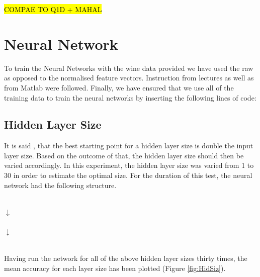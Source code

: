 \documentclass[10pt,twocolumn,letterpaper]{article}
\begin{document}
\hl{COMPAE TO Q1D + MAHAL}

\section{Neural Network}

To train the Neural Networks with the wine data provided we have used the raw as opposed to the normalised feature vectors. Instruction from lectures as well as from Matlab \cite{MatlabWine} were followed.  Finally, we have ensured that we use all of the training data to train the neural networks by inserting the following lines of code:

\begin{center}
\end{center}


\subsection{Hidden Layer Size}
It is said \cite{NN_Java}, that the best starting point for a hidden layer size is double the input layer size. Based on the outcome of that, the hidden layer size should then be varied accordingly. In this experiment, the hidden layer size was varied from 1 to 30 in order to estimate the optimal size. For the duration of this test, the neural network had the following structure.

\begin{center}
 \\

\centering
$\downarrow$ \\

\centering
{}\\

\centering
$\downarrow$\\

\centering
{}\\

\end{center}

Having run the network for all of the above hidden layer sizes thirty times, the mean accuracy for each layer size has been plotted (Figure \ref{fig:HidSiz}).
\end{document}
